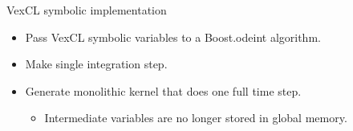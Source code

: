 \documentclass[@BEAMER_OPTIONS@]{beamer}
\begin{document}
\begin{frame}[fragile]{VexCL symbolic implementation}
    \begin{itemize}
        \item Pass VexCL symbolic variables to a Boost.odeint algorithm.
        \item Make single integration step.
        \item Generate monolithic kernel that does one full time step.
            \begin{itemize}
                \item Intermediate variables are no longer stored in global
                    memory.
            \end{itemize}
    \end{itemize}
\end{frame}

\note{ }

\end{document}
